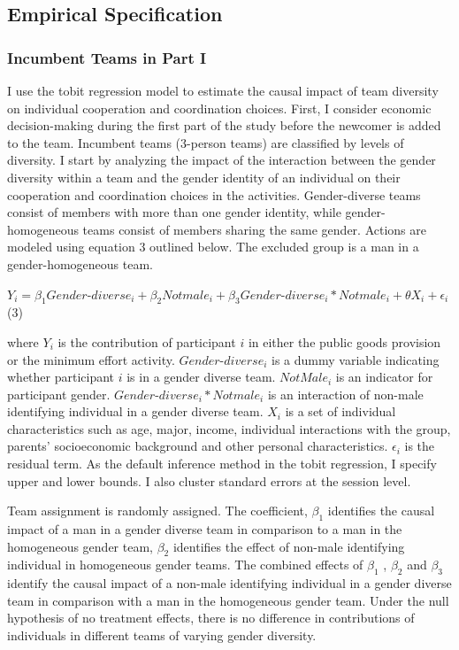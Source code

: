 \subsection{Empirical Specification} \label{subsec:Specification}
\subsubsection{Incumbent Teams in Part I} 
I use the tobit regression model to estimate the causal impact of team diversity on individual cooperation and coordination choices. First, I consider economic decision-making during the first part of the study before the newcomer is added to the team. Incumbent teams (3-person teams) are classified by levels of diversity. I start by analyzing the impact of the interaction between the gender diversity within a team and the gender identity of an individual on their cooperation and coordination choices in the activities. Gender-diverse teams consist of members with more than one gender identity, while gender-homogeneous teams consist of members sharing the same gender. Actions are modeled using equation 3 outlined below. The excluded group is a man in a gender-homogeneous team. 
\begin{center}      
 $ Y_{i}= \beta_1 Gender$-$diverse_{i} + \beta_2Notmale_{i}+\beta_3 Gender$-$diverse_{i}*Notmale_{i} + \theta X_{i} + \epsilon_{i} $ (3)
\end{center}

\noindent where $Y_{i}$ is the contribution of participant $i$ in either the public goods provision or the minimum effort activity. $Gender$-$diverse_{i}$ is a dummy variable indicating whether participant $i$ is in a gender diverse team. $NotMale_{i}$ is an indicator for participant gender. $Gender$-$diverse_{i}*Notmale_{i}$ is an interaction of non-male identifying individual in a gender diverse team. $X_{i}$ is a set of individual characteristics such as age, major, income, individual interactions with the group, parents' socioeconomic background and other personal characteristics. $\epsilon_{i}$ is the residual term. As the default inference method in the tobit regression, I specify upper and lower bounds. I also cluster standard errors at the session level.

Team assignment is randomly assigned. The coefficient, $\beta_1$ identifies the causal impact of a man in a gender diverse team in comparison to a man in the homogeneous gender team, $\beta_2$ identifies the effect of non-male identifying individual in homogeneous gender teams. The combined effects of $\beta_1$ , $\beta_2$ and $\beta_3$ identify the causal impact of a non-male identifying individual in a gender diverse team in comparison with a man in the homogeneous gender team. Under the null hypothesis of no treatment effects, there is no difference in contributions of individuals in different teams of varying gender diversity. 

